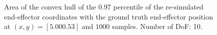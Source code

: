 \documentclass[conference]{IEEEtran}
\begin{document}
\begin{figure}[tbh]
\centering

    \caption{Area of the convex hull of the 0.97 percentile of the re-simulated end-effector coordinates with the ground truth end-effector position at $(x, y) = [5.00 0.53]$ and $1000$ samples. Number of DoF: 10.}
\end{figure}
\end{document}
